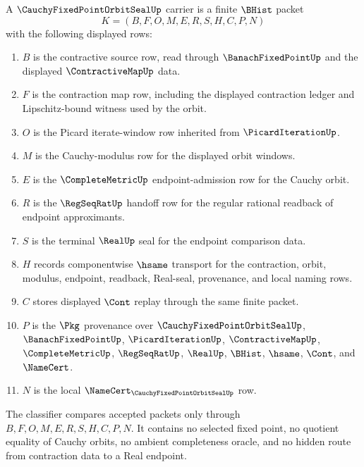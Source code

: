 \begin{definition}
\label{def:cauchy-fixed-point-orbit-seal-carrier}
A $\CauchyFixedPointOrbitSealUp$ carrier is a finite $\BHist$ packet
$$
K=(B,F,O,M,E,R,S,H,C,P,N)
$$
with the following displayed rows:
\begin{enumerate}
\item $B$ is the contractive source row, read through $\BanachFixedPointUp$ and the displayed $\ContractiveMapUp$ data.
\item $F$ is the contraction map row, including the displayed contraction ledger and Lipschitz-bound witness used by the orbit.
\item $O$ is the Picard iterate-window row inherited from $\PicardIterationUp$.
\item $M$ is the Cauchy-modulus row for the displayed orbit windows.
\item $E$ is the $\CompleteMetricUp$ endpoint-admission row for the Cauchy orbit.
\item $R$ is the $\RegSeqRatUp$ handoff row for the regular rational readback of endpoint approximants.
\item $S$ is the terminal $\RealUp$ seal for the endpoint comparison data.
\item $H$ records componentwise $\hsame$ transport for the contraction, orbit, modulus, endpoint, readback, Real-seal, provenance, and local naming rows.
\item $C$ stores displayed $\Cont$ replay through the same finite packet.
\item $P$ is the $\Pkg$ provenance over $\CauchyFixedPointOrbitSealUp$, $\BanachFixedPointUp$, $\PicardIterationUp$, $\ContractiveMapUp$, $\CompleteMetricUp$, $\RegSeqRatUp$, $\RealUp$, $\BHist$, $\hsame$, $\Cont$, and $\NameCert$.
\item $N$ is the local $\NameCert_{\CauchyFixedPointOrbitSealUp}$ row.
\end{enumerate}
The classifier compares accepted packets only through $B,F,O,M,E,R,S,H,C,P,N$. It contains no selected fixed point, no quotient equality of Cauchy orbits, no ambient completeness oracle, and no hidden route from contraction data to a Real endpoint.
\end{definition}

